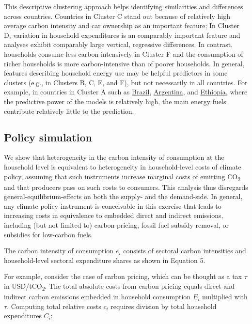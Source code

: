 \documentclass[12pt, a4paper]{article}
\begin{document}
\begin{refsection}
This descriptive clustering approach helps identifying similarities and differences across countries. Countries in Cluster C stand out because of relatively high average carbon intensity and car ownership as an important feature; In Cluster D, variation in household expenditures is an comparably important feature and analyses exhibit comparably large vertical, regressive differences. In contrast, households consume less carbon-intensively in Cluster F and the consumption of richer households is more carbon-intensive than of poorer households. In general, features describing household energy use may be helpful predictors in some clusters (e.g., in Clusters B, C, E, and F), but not necessarily in all countries. For example, in countries in Cluster A such as \hyperref[fig:5b_BRA]{Brazil}, \hyperref[fig:5b_URY]{Argentina}, and \hyperref[fig:5b_ETH]{Ethiopia}, where the predictive power of the models is relatively high, the main energy fuels contribute relatively little to the prediction.

\subsection{Policy simulation}\label{sec:policysimulation}

We show that heterogeneity in the carbon intensity of consumption at the household level is equivalent to heterogeneity in household-level costs of climate policy, assuming that such instruments increase marginal costs of emitting CO\textsubscript{2} and that producers pass on such costs to consumers. This analysis thus disregards general-equilibrium-effects on both the supply- and the demand-side. In general, any climate policy instrument is conceivable in this exercise that leads to increasing costs in equivalence to embedded direct and indirect emissions, including (but not limited to) carbon pricing, fossil fuel subsidy removal, or subsidies for low-carbon fuels.

The carbon intensity of consumption $e_{i}$ consists of sectoral carbon intensities and household-level sectoral expenditure shares as shown in Equation 5. 

For example, consider the case of carbon pricing, which can be thought as a tax $\tau$ in USD/tCO\textsubscript{2}. The total absolute costs from carbon pricing equals direct and indirect carbon emissions embedded in household consumption $E_{i}$ multiplied with $\tau$. Computing total relative costs $c_{i}$ requires division by total household expenditures $C_{i}$:


\end{refsection}
\end{document}
